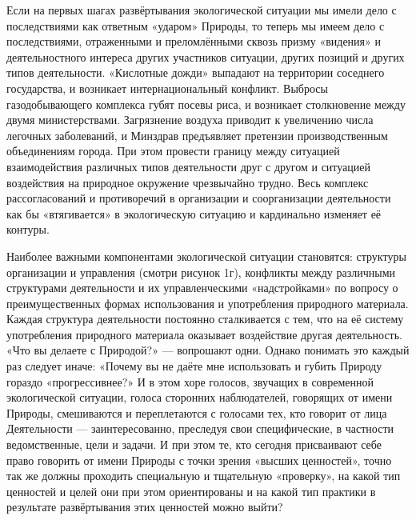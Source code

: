 \documentclass[11pt,a4paper]{article}
\begin{document}
Если на первых шагах развёртывания экологической ситуации мы имели дело с
последствиями как ответным «ударом» Природы, то теперь мы имеем дело с
последствиями, отраженными и преломлёнными сквозь призму «видения» и
деятельностного интереса других участников ситуации, других позиций и других
типов деятельности. «Кислотные дожди» выпадают на территории соседнего
государства, и возникает интернациональный конфликт. Выбросы газодобывающего
комплекса губят посевы риса, и возникает столкновение между двумя
министерствами. Загрязнение воздуха приводит к увеличению числа легочных
заболеваний, и Минздрав предъявляет претензии производственным объединениям
города. При этом провести границу между ситуацией взаимодействия различных
типов деятельности друг с другом и ситуацией воздействия на природное
окружение чрезвычайно трудно. Весь комплекс рассогласований и противоречий в
организации и соорганизации деятельности как бы «втягивается» в экологическую
ситуацию и кардинально изменяет её контуры. 

Наиболее важными компонентами экологической ситуации становятся: структуры
организации и управления (смотри рисунок 1г), конфликты между различными
структурами деятельности и их управленческими «надстройками» по вопросу о
преимущественных формах использования и употребления природного
материала. Каждая структура деятельности постоянно сталкивается с тем, что на
её систему употребления природного материала оказывает воздействие другая
деятельность. «Что вы делаете с Природой?» — вопрошают одни. Однако понимать
это каждый раз следует иначе: «Почему вы не даёте мне использовать и губить
Природу гораздо «прогрессивнее?» И в этом хоре голосов, звучащих в современной
экологической ситуации, голоса сторонних наблюдателей, говорящих от имени
Природы, смешиваются и переплетаются с голосами тех, кто говорит от лица
Деятельности — заинтересованно, преследуя свои специфические, в частности
ведомственные, цели и задачи. И при этом те, кто сегодня присваивают себе
право говорить от имени Природы с точки зрения «высших ценностей», точно так
же должны проходить специальную и тщательную «проверку», на какой тип
ценностей и целей они при этом ориентированы и на какой тип практики в
результате развёртывания этих ценностей можно выйти? 
\end{document}
